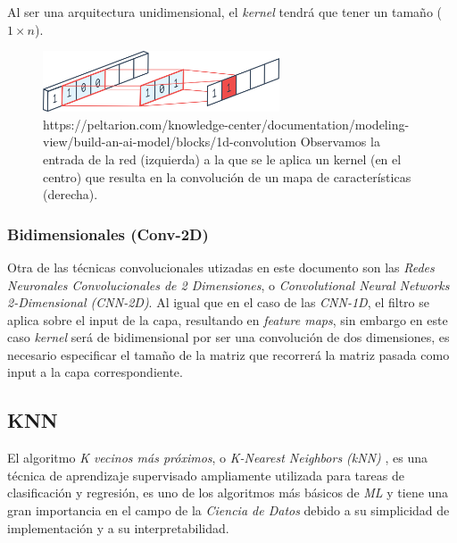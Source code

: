                 Al ser una arquitectura unidimensional, el \textit{kernel} tendrá que tener un tamaño ($1 \times n$).

                \begin{figure}[h]
                    \centering
                    \includegraphics[width=7cm]{archivos/CNN/1D/1DConvolution}
                    \caption{https://peltarion.com/knowledge-center/documentation/modeling-view/build-an-ai-model/blocks/1d-convolution Observamos la entrada de la red (izquierda) a la que se le aplica un kernel (en el centro) que resulta en la convolución de un mapa de características (derecha).}
                    \label{1DConvolutionImage}
                \end{figure}

                
            \subsubsection {Bidimensionales (Conv-2D)}
                Otra de las técnicas convolucionales utizadas en este documento son las \textit{Redes Neuronales Convolucionales de 2 Dimensiones}, o \textit{Convolutional Neural Networks 2-Dimensional (CNN-2D)}. Al igual que en el caso de las \textit{CNN-1D}, el filtro se aplica sobre el input de la capa, resultando en \textit{feature maps}, sin embargo en este caso \textit{kernel} será de bidimensional por ser una convolución de dos dimensiones, es necesario especificar el tamaño de la matriz que recorrerá la matriz pasada como input a la capa correspondiente.

                \textit{}

        \subsection {KNN}

            El algoritmo \textit{K vecinos más próximos}, o \textit{K-Nearest Neighbors (kNN)} \cite{KNN}, es una técnica de aprendizaje supervisado ampliamente utilizada para tareas de clasificación y regresión, es uno de los algoritmos más básicos de \textit{ML} y tiene una gran importancia en el campo de la \textit{Ciencia de Datos} debido a su simplicidad de implementación y a su interpretabilidad.

